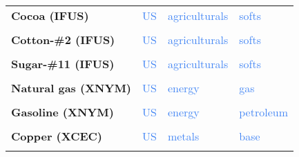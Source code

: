 \documentclass[
  authoryear,
  preprint,
  3p]{elsarticle}
\begin{document}
\begin{longtable}[t]{>{}l>{}l>{}l>{}l}
\textbf{Cocoa (IFUS)} & \textcolor[HTML]{4285f4}{US} & \textcolor[HTML]{4285f4}{agriculturals} & \textcolor[HTML]{4285f4}{softs}\\
\addlinespace
\textbf{\cellcolor{gray!10}{Coffee-C (IFUS)}} & \textcolor[HTML]{4285f4}{\cellcolor{gray!10}{US}} & \textcolor[HTML]{4285f4}{\cellcolor{gray!10}{agriculturals}} & \textcolor[HTML]{4285f4}{\cellcolor{gray!10}{softs}}\\
\textbf{Cotton-\#2 (IFUS)} & \textcolor[HTML]{4285f4}{US} & \textcolor[HTML]{4285f4}{agriculturals} & \textcolor[HTML]{4285f4}{softs}\\
\textbf{\cellcolor{gray!10}{Orange juice (IFUS)}} & \textcolor[HTML]{4285f4}{\cellcolor{gray!10}{US}} & \textcolor[HTML]{4285f4}{\cellcolor{gray!10}{agriculturals}} & \textcolor[HTML]{4285f4}{\cellcolor{gray!10}{softs}}\\
\textbf{Sugar-\#11 (IFUS)} & \textcolor[HTML]{4285f4}{US} & \textcolor[HTML]{4285f4}{agriculturals} & \textcolor[HTML]{4285f4}{softs}\\
\textbf{\cellcolor{gray!10}{Lumber (XCME)}} & \textcolor[HTML]{4285f4}{\cellcolor{gray!10}{US}} & \textcolor[HTML]{4285f4}{\cellcolor{gray!10}{agriculturals}} & \textcolor[HTML]{4285f4}{\cellcolor{gray!10}{softs}}\\
\addlinespace
\textbf{Natural gas (XNYM)} & \textcolor[HTML]{4285f4}{US} & \textcolor[HTML]{4285f4}{energy} & \textcolor[HTML]{4285f4}{gas}\\
\textbf{\cellcolor{gray!10}{Crude oil-WTI (XNYM)}} & \textcolor[HTML]{4285f4}{\cellcolor{gray!10}{US}} & \textcolor[HTML]{4285f4}{\cellcolor{gray!10}{energy}} & \textcolor[HTML]{4285f4}{\cellcolor{gray!10}{petroleum}}\\
\textbf{Gasoline (XNYM)} & \textcolor[HTML]{4285f4}{US} & \textcolor[HTML]{4285f4}{energy} & \textcolor[HTML]{4285f4}{petroleum}\\
\textbf{\cellcolor{gray!10}{Heating oil (XNYM)}} & \textcolor[HTML]{4285f4}{\cellcolor{gray!10}{US}} & \textcolor[HTML]{4285f4}{\cellcolor{gray!10}{energy}} & \textcolor[HTML]{4285f4}{\cellcolor{gray!10}{petroleum}}\\
\textbf{Copper (XCEC)} & \textcolor[HTML]{4285f4}{US} & \textcolor[HTML]{4285f4}{metals} & \textcolor[HTML]{4285f4}{base}\\
\addlinespace
\textbf{\cellcolor{gray!10}{Gold (XCEC)}} & \textcolor[HTML]{4285f4}{\cellcolor{gray!10}{US}} & \textcolor[HTML]{4285f4}{\cellcolor{gray!10}{metals}} & \textcolor[HTML]{4285f4}{\cellcolor{gray!10}{precious}}\\

\end{longtable}
\end{document}

